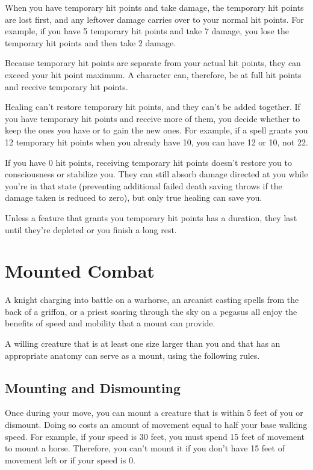 When you have temporary hit points and take damage, the temporary hit points are lost first, and any leftover damage carries over to your normal hit points. For example, if you have 5 temporary hit points and take 7 damage, you lose the temporary hit points and then take 2 damage.

Because temporary hit points are separate from your actual hit points, they can exceed your hit point maximum. A character can, therefore, be at full hit points and receive temporary hit points.

Healing can't restore temporary hit points, and they can't be added together. If you have temporary hit points and receive more of them, you decide whether to keep the ones you have or to gain the new ones. For example, if a spell grants you 12 temporary hit points when you already have 10, you can have 12 or 10, not 22.

If you have 0 hit points, receiving temporary hit points doesn't restore you to consciousness or stabilize you. They can still absorb damage directed at you while you're in that state (preventing additional failed death saving throws if the damage taken is reduced to zero), but only true healing can save you.

Unless a feature that grants you temporary hit points has a duration, they last until they're depleted or you finish a long rest.

\section{Mounted Combat}

A knight charging into battle on a warhorse, an arcanist casting spells from the back of a griffon, or a priest soaring through the sky on a pegasus all enjoy the benefits of speed and mobility that a mount can provide.

A willing creature that is at least one size larger than you and that has an appropriate anatomy can serve as a mount, using the following rules.

\subsection{Mounting and Dismounting}

Once during your move, you can mount a creature that is within 5 feet of you or dismount. Doing so costs an amount of movement equal to half your base walking speed. For example, if your speed is 30 feet, you must spend 15 feet of movement to mount a horse. Therefore, you can't mount it if you don't have 15 feet of movement left or if your speed is 0.


